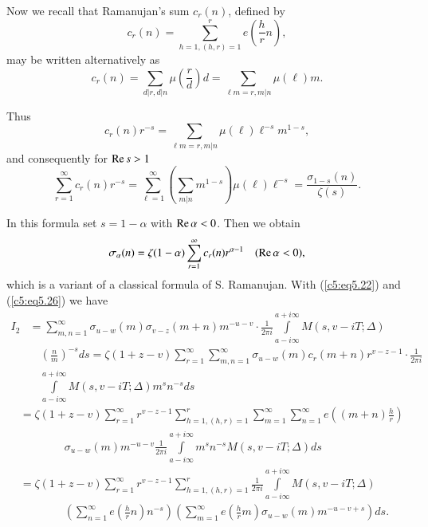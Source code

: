 Now we recall that Ramanujan's sum $c_r(n)$, defined by
\begin{equation}
c_r(n) = \sum\limits^r_{h=1, (h,r)=1} e \left(\frac{h}{r}n \right),
\label{c5:eq5.25} 
\end{equation}
may be written alternatively as 
$$
c_r(n) = \sum\limits_{d|r,d|n} \mu \left(\frac{r}{d} \right)d =
\sum\limits_{\ell m =r, m|n} \mu(\ell) m. 
$$

Thus
$$
c_r(n)r^{-s} = \sum\limits_{\ell m =r, m|n} \mu(\ell) \ell^{-s} m^{1-s},
$$
and consequently for $\operatorname{Re} s >1$
$$
\sum\limits^\infty_{r=1} c_r(n) r^{-s} = \sum\limits^\infty_{\ell=1}
\left(\sum\limits_{m|n} m^{1-s} \right) \mu (\ell) \ell^{-s} =
\frac{\sigma_{1-s} (n)}{\zeta(s)}.  
$$

In this formula set $s=1-\alpha$ with $\operatorname{Re} \alpha <0$. Then we obtain
\begin{equation}
\sigma_\alpha (n) = \zeta(1-\alpha) \sum\limits^\infty_{r=1} c_r(n)
r^{\alpha-1} \quad (\operatorname{Re} \alpha < 0), \label{c5:eq5.26} 
\end{equation}
which is a variant of a classical formula of S. Ramanujan. With
(\ref{c5:eq5.22}) and (\ref{c5:eq5.26}) we have  
\begin{align*}
I_2 & = \sum\limits^\infty_{m,n=1} \sigma_{u-w} (m) \sigma_{v-z} (m+n)
m^{-u-v} \cdot \frac{1}{2\pi i} \int\limits^{a+i\infty}_{a-i\infty}
M(s,v-iT;\Delta) \\ 
& \quad  \left(\frac{n}{m} \right)^{-s} ds = 
\zeta(1+z-v) \sum\limits^\infty_{r=1} \sum\limits^\infty_{m,n=1}
\sigma_{u-w} (m) c_r (m+n) r^{v-z-1} \cdot  \frac{1}{2\pi i}\\ 
& \quad  \int\limits^{a+ i \infty}_{a-i \infty} M(s, v - iT;\Delta)
m^s n^{-s} ds  
\end{align*}\pageoriginale
\begin{align*}
& = \zeta (1+z-v) \sum\limits^\infty_{r=1} r^{v-z-1}
  \sum\limits^r_{h=1, (h,r) =1 } \sum\limits^\infty_{m=1}
  \sum\limits^{\infty}_{n=1} e \left((m+n) \frac{h}{r} \right)\\ 
& \qquad \qquad  \sigma_{u-w} (m) m^{-u-v} \frac{1}{2\pi i}
  \int\limits^{a+i\infty}_{a-i\infty} m^s n^{-s} M(s,v-iT;\Delta) ds
  \\ 
& = \zeta (1+z-v) \sum\limits^\infty_{r=1} r^{v-z-1}
  \sum\limits^r_{h=1,(h,r)=1} \frac{1}{2\pi i} \int\limits^{a+ i
    \infty}_{a-i\infty} M(s, v - iT;\Delta) \\ 
& \qquad \qquad \left(\sum\limits^\infty_{n=1} e(\frac{h}{r} n) n^{-s}
  \right) \left(\sum\limits^\infty_{m=1} e (\frac{h}{r} m)
  \sigma_{u-w} (m) m^{-u-v+s} \right) ds. 
\end{align*}

